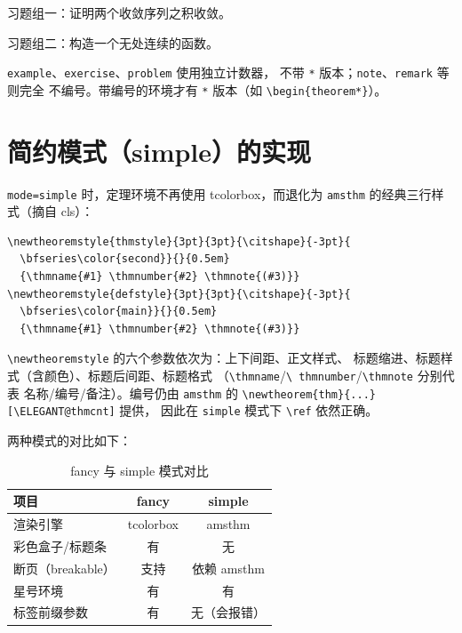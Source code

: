 \begin{problemset}
\item 习题组一：证明两个收敛序列之积收敛。
\item 习题组二：构造一个无处连续的函数。
\end{problemset}

\begin{remark}
\verb|example|、\verb|exercise|、\verb|problem| 使用独立计数器，
不带 \texttt{*} 版本；\verb|note|、\verb|remark| 等则完全
不编号。带编号的环境才有 \texttt{*} 版本（如
\verb|\begin{theorem*}|）。
\end{remark}

\section{简约模式（simple）的实现}

\texttt{mode=simple} 时，定理环境不再使用 tcolorbox，而退化为
\texttt{amsthm} 的经典三行样式（摘自 cls）：

\begin{lstlisting}
\newtheoremstyle{thmstyle}{3pt}{3pt}{\citshape}{-3pt}{
  \bfseries\color{second}}{}{0.5em}
  {\thmname{#1} \thmnumber{#2} \thmnote{(#3)}}
\newtheoremstyle{defstyle}{3pt}{3pt}{\citshape}{-3pt}{
  \bfseries\color{main}}{}{0.5em}
  {\thmname{#1} \thmnumber{#2} \thmnote{(#3)}}
\end{lstlisting}

\verb|\newtheoremstyle| 的六个参数依次为：上下间距、正文样式、
标题缩进、标题样式（含颜色）、标题后间距、标题格式
（\texttt{\textbackslash thmname}/\texttt{\textbackslash
thmnumber}/\texttt{\textbackslash thmnote} 分别代表
名称/编号/备注）。编号仍由 \texttt{amsthm} 的
\verb|\newtheorem{thm}{...}[\ELEGANT@thmcnt]| 提供，
因此在 \texttt{simple} 模式下 \verb|\ref| 依然正确。

两种模式的对比如下：

\begin{table}[htbp]
  \centering
  \caption{fancy 与 simple 模式对比}\label{tab:modes}
  \begin{tabular}{lcc}
    \toprule
    项目 & fancy & simple \\
    \midrule
    渲染引擎 & tcolorbox & amsthm \\
    彩色盒子/标题条 & 有 & 无 \\
    断页（breakable）& 支持 & 依赖 amsthm \\
    星号环境 & 有 & 有 \\
    标签前缀参数 & 有 & 无（会报错）\\
    \bottomrule
  \end{tabular}
\end{table}

